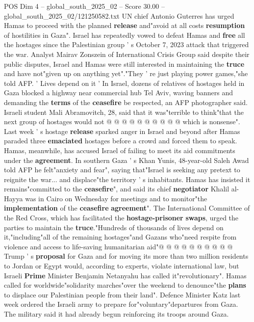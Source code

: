 \begin{textsample}{POS Dim 4 – global\_south\_2025\_02 – Score 30.00 – global\_south\_2025\_02/121250582.txt}
UN chief Antonio Guterres has urged Hamas to proceed with the planned \textbf{release} and"avoid at all costs \textbf{resumption} of hostilities in Gaza".
Israel has repeatedly vowed to defeat Hamas and \textbf{free} all the hostages since the Palestinian group ' s October 7, 2023 attack that triggered the war.
Analyst Mairav Zonszein of International Crisis Group said despite their public disputes, Israel and Hamas were still interested in maintaining the \textbf{truce} and have not"given up on anything yet"."They ' re just playing power games,"she told AFP. ' Lives depend on it ' In Israel, dozens of relatives of hostages held in Gaza blocked a highway near commercial hub Tel Aviv, waving banners and demanding the \textbf{terms} of the \textbf{ceasefire} be respected, an AFP photographer said.
Israeli student Mali Abramovitch, 28, said that it was"terrible to think"that the next group of hostages would not @ @ @ @ @ @ @ @ @ @ which is nonsense".
Last week ' s hostage \textbf{release} sparked anger in Israel and beyond after Hamas paraded three \textbf{emaciated} hostages before a crowd and forced them to speak.
Hamas, meanwhile, has accused Israel of failing to meet its aid commitments under the \textbf{agreement}.
In southern Gaza ' s Khan Yunis, 48-year-old Saleh Awad told AFP he felt"anxiety and fear", saying that"Israel is seeking any pretext to reignite the war... and displace"the territory ' s inhabitants.
Hamas has insisted it remains"committed to the \textbf{ceasefire}", and said its chief \textbf{negotiator} Khalil al-Hayya was in Cairo on Wednesday for meetings and to monitor"the \textbf{implementation} of the \textbf{ceasefire} \textbf{agreement}".
The International Committee of the Red Cross, which has facilitated the \textbf{hostage-prisoner} \textbf{swaps}, urged the parties to maintain the \textbf{truce}."Hundreds of thousands of lives depend on it,"including"all of the remaining hostages"and Gazans who"need respite from violence and access to life-saving humanitarian aid"@ @ @ @ @ @ @ @ @ @ Trump ' s \textbf{proposal} for Gaza and for moving its more than two million residents to Jordan or Egypt would, according to experts, violate international law, but Israeli \textbf{Prime} Minister Benjamin Netanyahu has called it"revolutionary".
Hamas called for worldwide"solidarity marches"over the weekend to denounce"the \textbf{plans} to displace our Palestinian people from their land".
Defence Minister Katz last week ordered the Israeli army to prepare for"voluntary"departures from Gaza.
The military said it had already begun reinforcing its troops around Gaza.

\end{textsample}
